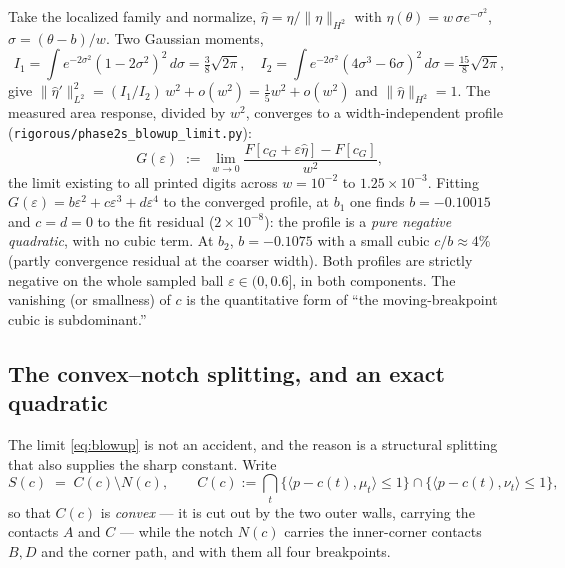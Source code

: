 \documentclass[11pt]{amsart}
\theoremstyle{plain}
\theoremstyle{definition}
\newcommand{\cG}{c_{G}}
\begin{document}
Take the localized family and normalize, $\hat\eta =
\eta/\|\eta\|_{H^{2}}$ with $\eta(\theta) = w\,\sigma
e^{-\sigma^{2}}$, $\sigma=(\theta-b)/w$.  Two Gaussian moments,
\begin{equation}\label{eq:gauss-moments}
   I_{1} = \int e^{-2\sigma^{2}}(1-2\sigma^{2})^{2}\,d\sigma
         = \tfrac{3}{8}\sqrt{2\pi},
   \quad
   I_{2} = \int e^{-2\sigma^{2}}(4\sigma^{3}-6\sigma)^{2}\,d\sigma
         = \tfrac{15}{8}\sqrt{2\pi},
\end{equation}
give $\|\hat\eta'\|^{2}_{L^{2}} = (I_{1}/I_{2})\,w^{2} + o(w^{2}) =
\tfrac15 w^{2}+o(w^2)$ and $\|\hat\eta\|_{H^{2}}=1$.  The measured area
response, divided by $w^{2}$, converges to a width-independent profile
(\texttt{rigorous/phase2s\_blowup\_limit.py}):
\begin{equation}\label{eq:blowup}
   G(\varepsilon) \;:=\; \lim_{w\to0}
     \frac{F[\cG+\varepsilon\hat\eta] - F[\cG]}{w^{2}} ,
\end{equation}
the limit existing to all printed digits across $w = 10^{-2}$ to
$1.25\times10^{-3}$.  Fitting $G(\varepsilon)=b\varepsilon^{2}+
c\varepsilon^{3}+d\varepsilon^{4}$ to the converged profile, at $b_{1}$
one finds $b = -0.10015$ and $c = d = 0$ to the fit residual
($2\times10^{-8}$): the profile is a \emph{pure negative quadratic},
with no cubic term.  At $b_{2}$, $b=-0.1075$ with a small cubic
$c/b\approx 4\%$ (partly convergence residual at the coarser width).
Both profiles are strictly negative on the whole sampled ball
$\varepsilon\in(0,0.6]$, in both components.  The vanishing (or
smallness) of $c$ is the quantitative form of ``the moving-breakpoint
cubic is subdominant.''

\subsection*{The convex--notch splitting, and an exact quadratic}

The limit \eqref{eq:blowup} is not an accident, and the reason is a
structural splitting that also supplies the sharp constant.  Write
\begin{equation}\label{eq:convex-notch}
   S(c) \;=\; C(c)\setminus N(c),\qquad
   C(c) := \bigcap_{t}\bigl\{\langle p-c(t),\mu_{t}\rangle\leq1\bigr\}
           \cap\bigl\{\langle p-c(t),\nu_{t}\rangle\leq1\bigr\},
\end{equation}
so that $C(c)$ is \emph{convex} --- it is cut out by the two outer walls,
carrying the contacts $A$ and $C$ --- while the notch $N(c)$ carries the
inner-corner contacts $B,D$ and the corner path, and with them all four
breakpoints.
\end{document}
